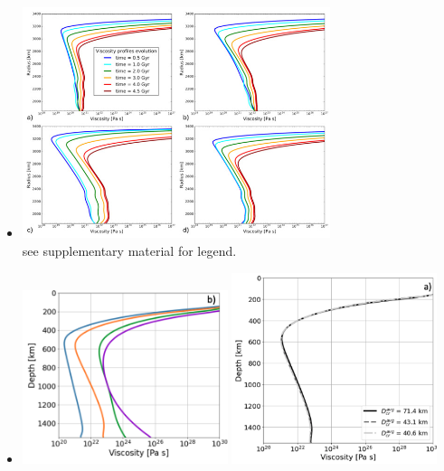\begin{itemize}
\item {}

\begin{center}
\includegraphics[width=9cm]{images/mars/viscosity/plpt18}\\
{\captionfont see supplementary material for legend.}
\end{center}

\item {}

\begin{center}
\includegraphics[width=6cm]{images/mars/viscosity/plwk22a}
\includegraphics[width=6cm]{images/mars/viscosity/plwk22d}
\end{center} 

\end{itemize}
